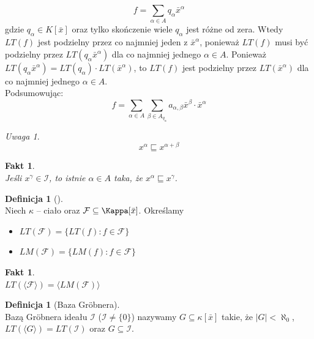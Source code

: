 \documentclass[11pt,a4paper]{article}
\newtheorem{fakt}[twierdzenie]{Fakt}
\theoremstyle{definition}
\newtheorem{definicja}[twierdzenie]{Definicja}
\theoremstyle{remark}
\newtheorem{uwaga}[twierdzenie]{Uwaga}
\begin{document}
\[
    f = \sum_{\alpha \in A} q_\alpha \bar{x}^\alpha
\]
gdzie $q_\alpha \in K[\bar{x}]$ oraz tylko skończenie wiele $q_\alpha$ jest różne od zera. Wtedy $LT(f)$ jest podzielny przez co najmniej jeden z $\bar{x}^\alpha$, ponieważ $LT(f)$ musi być podzielny przez $LT(q_\alpha \bar{x}^\alpha)$ dla co najmniej jednego $\alpha \in A$. Ponieważ $LT(q_\alpha \bar{x}^\alpha) = LT(q_\alpha) \cdot LT(\bar{x}^\alpha)$, to $LT(f)$ jest podzielny przez $LT(\bar{x}^\alpha)$ dla co najmniej jednego $\alpha \in A$.\\
Podsumowując:
\[
    f = \sum_{\alpha \in A} \sum_{\beta \in A_{q_\alpha}} a_{\alpha, \beta} \bar{x}^\beta \cdot \bar{x}^\alpha
\]
\begin{uwaga}~\\
    \[
        x^\alpha \sqsubseteq x^{\alpha +\beta} 
    \]
\end{uwaga}

\begin{fakt}~\\
    Jeśli $x^\gamma \in \mathcal{I}$, to istnie $\alpha \in A$ taka, że $x^\alpha \sqsubseteq x^\gamma$.
\end{fakt}

\begin{definicja}[]~\\
    Niech $\kappa$ -- ciało oraz $\mathcal{F} \subseteq \Kappa[\bar{x}]$. Określamy
    \begin{itemize}
        \item $LT(\mathcal{F}) = \{ LT(f): f \in \mathcal{F} \}$
        \item $LM(\mathcal{F}) = \{ LM(f): f \in \mathcal{F} \}$
    \end{itemize}
\end{definicja}

\begin{fakt}~\\
    $LT(\langle \mathcal{F} \rangle) = \langle LM(\mathcal{F}) \rangle$
\end{fakt}

\begin{definicja}[Baza Gröbnera]~\\
    Bazą Gröbnera ideału $\mathcal{I}$ ($\mathcal{I} \neq \{0\}$) nazywamy $G \subseteq \kappa[\bar{x}]$ takie, że $|G| < \aleph_0$, $LT(\langle G \rangle) = LT(\mathcal{I})$ oraz $G \subseteq \mathcal{I}$.
\end{definicja}
\end{document}
